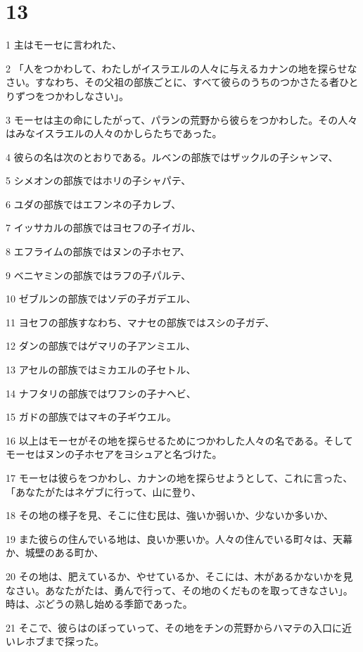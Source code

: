\chapter{13}

\par 1 主はモーセに言われた、
\par 2 「人をつかわして、わたしがイスラエルの人々に与えるカナンの地を探らせなさい。すなわち、その父祖の部族ごとに、すべて彼らのうちのつかさたる者ひとりずつをつかわしなさい」。
\par 3 モーセは主の命にしたがって、パランの荒野から彼らをつかわした。その人々はみなイスラエルの人々のかしらたちであった。
\par 4 彼らの名は次のとおりである。ルベンの部族ではザックルの子シャンマ、
\par 5 シメオンの部族ではホリの子シャパテ、
\par 6 ユダの部族ではエフンネの子カレブ、
\par 7 イッサカルの部族ではヨセフの子イガル、
\par 8 エフライムの部族ではヌンの子ホセア、
\par 9 ベニヤミンの部族ではラフの子パルテ、
\par 10 ゼブルンの部族ではソデの子ガデエル、
\par 11 ヨセフの部族すなわち、マナセの部族ではスシの子ガデ、
\par 12 ダンの部族ではゲマリの子アンミエル、
\par 13 アセルの部族ではミカエルの子セトル、
\par 14 ナフタリの部族ではワフシの子ナヘビ、
\par 15 ガドの部族ではマキの子ギウエル。
\par 16 以上はモーセがその地を探らせるためにつかわした人々の名である。そしてモーセはヌンの子ホセアをヨシュアと名づけた。
\par 17 モーセは彼らをつかわし、カナンの地を探らせようとして、これに言った、「あなたがたはネゲブに行って、山に登り、
\par 18 その地の様子を見、そこに住む民は、強いか弱いか、少ないか多いか、
\par 19 また彼らの住んでいる地は、良いか悪いか。人々の住んでいる町々は、天幕か、城壁のある町か、
\par 20 その地は、肥えているか、やせているか、そこには、木があるかないかを見なさい。あなたがたは、勇んで行って、その地のくだものを取ってきなさい」。時は、ぶどうの熟し始める季節であった。
\par 21 そこで、彼らはのぼっていって、その地をチンの荒野からハマテの入口に近いレホブまで探った。
